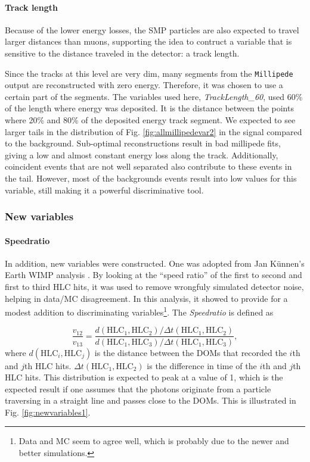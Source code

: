 \paragraph{Track length}
Because of the lower energy losses, the SMP particles are also expected to travel larger distances than muons, supporting the idea to contruct a variable that is sensitive to the distance traveled in the detector: a track length.

Since the tracks at this level are very dim, many segments from the \texttt{Millipede} output are reconstructed with zero energy. Therefore, it was chosen to use a certain part of the segments. The variables used here, \textit{TrackLength\_60}, used 60\% of the length where energy was deposited. It is the distance between the points where 20\% and 80\% of the deposited energy track segment. We expected to see larger tails in the distribution of Fig. \ref{fig:allmillipedevar2} in the signal compared to the background. Sub-optimal reconstructions result in bad millipede fits, giving a low and almost constant energy loss along the track. Additionally, coincident events that are not well separated also contribute to these events in the tail. However, most of the backgrounds events result into low values for this variable, still making it a powerful discriminative tool. 

\subsubsection{New variables}

\paragraph{Speedratio}
In addition, new variables were constructed. One was adopted from Jan K\"unnen's Earth WIMP analysis \cite{kunnenthesis}. By looking at the ``speed ratio'' of the first to second and first to third HLC hits, it was used to remove wrongfuly simulated detector noise, helping in data/MC disagreement. In this analysis, it showed to provide for a modest addition to discriminating variables\footnote{Data and MC seem to agree well, which is probably due to the newer and better simulations.}. The \textit{Speedratio} is defined as

\begin{equation}
\frac{v_{12}}{v_{13}} = \frac{d\left( \textrm{HLC}_1,\textrm{HLC}_2 \right)/\Delta t\left(\textrm{HLC}_1, \textrm{HLC}_2\right)}{d\left(\textrm{HLC}_1, \textrm{HLC}_3 \right)/\Delta t\left(\textrm{HLC}_1,\textrm{HLC}_3 \right)},
\end{equation}
where $d\left( \textrm{HLC}_i,\textrm{HLC}_j \right)$ is the distance between the DOMs that recorded the $i$th and $j$th HLC hits. $\Delta t\left(\textrm{HLC}_1, \textrm{HLC}_2\right)$ is the difference in time of the $i$th and $j$th HLC hits. This distribution is expected to peak at a value of 1, which is the expected result if one assumes that the photons originate from a particle traversing in a straight line and passes close to the DOMs. This is illustrated in Fig. \ref{fig:newvariables1}.

